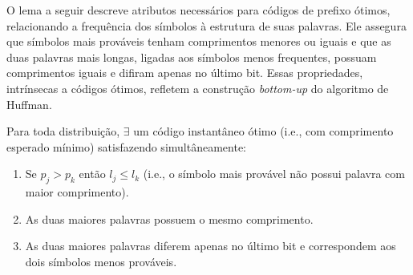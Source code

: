 O lema a seguir descreve atributos necessários para códigos de prefixo ótimos,
relacionando a frequência dos símbolos à estrutura de suas palavras. Ele
assegura que símbolos mais prováveis tenham comprimentos menores ou iguais e
que as duas palavras mais longas, ligadas aos símbolos menos frequentes,
possuam comprimentos iguais e difiram apenas no último bit. Essas propriedades,
intrínsecas a códigos ótimos, refletem a construção \emph{bottom-up} do algoritmo de
Huffman.


\begin{lemma}\label{lem:propcodinstot}
Para toda distribuição, $\exists$ um código instantâneo ótimo (i.e., com comprimento esperado mínimo)
satisfazendo simultâneamente:
\begin{enumerate}[itemsep=0pt, topsep=0pt, parsep=0pt, partopsep=0pt]
  \item\label{propcodinstot1} Se $p_j > p_k$ então $l_j \leq l_k$ (i.e., o símbolo mais provável não possui palavra com maior comprimento).
  \item\label{propcodinstot2} As duas maiores palavras possuem o mesmo comprimento.
  \item\label{propcodinstot3} As duas maiores palavras diferem apenas no último bit e correspondem aos dois símbolos menos prováveis.
\end{enumerate}
\end{lemma}

